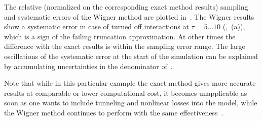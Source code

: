 The relative (normalized on the corresponding exact method results) sampling and systematic errors of the Wigner method are plotted in~.
The Wigner results show a systematic error in case of turned off interactions at $\tau = 5 \ldots 10$ (,~(a)), which is a sign of the failing truncation approximation.
At other times the difference with the exact results is within the sampling error range.
The large oscillations of the systematic error at the start of the simulation can be explained by accumulating uncertainties in the denominator of~.

Note that while in this particular example the exact method gives more accurate results at comparable or lower computational cost, it becomes unapplicable as soon as one wants to include tunneling and nonlinear losses into the model, while the Wigner method continues to perform with the same effectiveness~\cite{Opanchuk2012a}.
